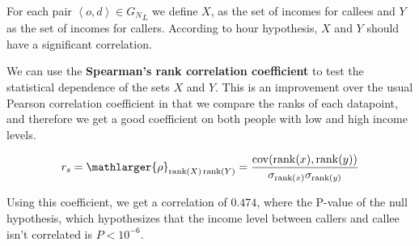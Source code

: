 For each pair \( \left< o, d \right> \in {G_N}_L \) we define \( X \), as the set of incomes for callees and \( Y \) as the set of incomes for callers. According to hour hypothesis, \( X \) and \( Y \) should have a significant correlation.

We can use the \textbf{Spearman's rank correlation coefficient} to test the statistical dependence of the sets \( X \) and \( Y \). This is an improvement over the usual Pearson correlation coefficient in that we compare the ranks of each datapoint, and therefore we get a good coefficient on both people with low and high income levels.

\[
r_s = \mathlarger{\rho}_{\operatorname{rank}(X) \operatorname{rank}(Y)} = \frac{\operatorname{cov}(\operatorname{rank}(x), \operatorname{rank}(y))}{\sigma_{\operatorname{rank}(x)} \sigma_{\operatorname{rank}(y)}}
\]

Using this coefficient, we get a correlation of \( \num{0.474} \), where the P-value of the null hypothesis, which hypothesizes that the income level between callers and callee isn't correlated is \( P < 10^{-6} \).